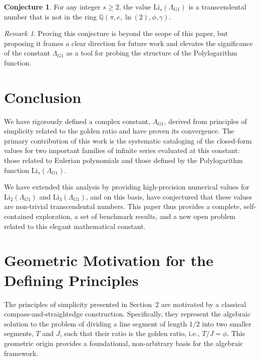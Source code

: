 \documentclass{amsart}
\theoremstyle{plain}
\theoremstyle{definition}
\newtheorem{conjecture}[theorem]{Conjecture}
\theoremstyle{remark}
\newtheorem*{remark}{Remark}
\newcommand{\LambdaG}{\Lambda_{G1}}
\begin{document}
\begin{conjecture}
For any integer $s \ge 2$, the value $\mathrm{Li}_s(\LambdaG)$ is a transcendental number that is not in the ring $\mathbb{Q}(\pi, e, \ln(2), \phi, \gamma)$.
\end{conjecture}
\begin{remark}
Proving this conjecture is beyond the scope of this paper, but proposing it frames a clear direction for future work and elevates the significance of the constant $\LambdaG$ as a tool for probing the structure of the Polylogarithm function.
\end{remark}

\section{Conclusion}
We have rigorously defined a complex constant, $\LambdaG$, derived from principles of simplicity related to the golden ratio and have proven its convergence. The primary contribution of this work is the systematic cataloging of the closed-form values for two important families of infinite series evaluated at this constant: those related to Eulerian polynomials and those defined by the Polylogarithm function $\mathrm{Li}_s(\LambdaG)$.

We have extended this analysis by providing high-precision numerical values for $\mathrm{Li}_2(\LambdaG)$ and $\mathrm{Li}_3(\LambdaG)$, and on this basis, have conjectured that these values are non-trivial transcendental numbers. This paper thus provides a complete, self-contained exploration, a set of benchmark results, and a new open problem related to this elegant mathematical constant.

\appendix
\section{Geometric Motivation for the Defining Principles}
\label{app:A}
The principles of simplicity presented in Section~2 are motivated by a classical compass-and-straightedge construction. Specifically, they represent the algebraic solution to the problem of dividing a line segment of length $1/2$ into two smaller segments, $T$ and $J$, such that their ratio is the golden ratio, i.e., $T/J = \phi$. This geometric origin provides a foundational, non-arbitrary basis for the algebraic framework.
\end{document}

